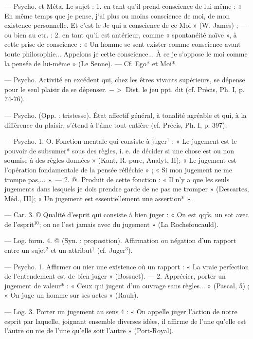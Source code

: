 
	\begin{itemize}[leftmargin=1cm, label=, itemsep=1pt]
	
 — Psycho. et Méta. Le sujet :
1. en tant qu'il prend conscience
de lui-même : « En même temps que
je pense, j'ai plus ou moins conscience de moi, de mon existence
personnelle. Et c’est le Je qui a
conscience de ce Moi » (W. James) ;
— ou bien au ctr. : 2. en tant qu'il
est antérieur, comme « spontanéité
naïve », à cette prise de conscience :
« Un homme se sent exister comme
conscience avant toute philosophie...
Appelons je cette conscience... À ce
je s'oppose le moi comme la pensée
de lui-même » (Le Senne). — Cf.
Ego* et Moi*.

 — Psycho. Activité
en excédent qui, chez les êtres
vivants supérieurs, se dépense pour
le seul plaisir de se dépenser. $->$
Dist. le jeu ppt. dit (cf. Précis, Ph. I,
p. 74-76).

 — Psycho. (Opp. : tristesse).
État affectif général, à tonalité
agréable et qui, à la différence du
plaisir, s'étend à l’âme tout entière
(cf. Précis, Ph. I, p. 397).

 — Psycho. 1. O. Fonction
mentale qui consiste à juger$^1$ : « Le
jugement est le pouvoir de subsumer* sous des règles, i. e. de décider
si une chose est ou non soumise
à des règles données » (Kant, R. pure,
Analyt, II); « Le jugement est
l’opération fondamentale de la
pensée réfléchie » ; « Si mon jugement ne me trompe pas,... ». —
2. @. Produit de cette fonction :
« Il n’y a que les seuls jugements
dans lesquels je dois prendre garde
de ne pas me tromper » (Descartes,
Méd., III); « Un jugement est essentiellement une assertion* ».

— Car. 3. © Qualité d'esprit qui
consiste à bien juger : « On est qqfs.
un sot avec de l’esprit$^{10}$; on ne l’est
jamais avec du jugement » (La
Rochefoucauld).

— Log. form. 4. @ (Syn. : proposition). Affirmation ou négation d’un
rapport entre un sujet$^2$ et un attribut$^1$
(cf. Juger$^3$).

 — Psycho. 1. Affirmer ou nier
une existence où un rapport : « La
vraie perfection de l’entendement
est de bien juger » (Bossuet). — 2.
Apprécier, porter un jugement de
valeur* : « Ceux qui jugent d'un
ouvrage sans règles... » (Pascal, 5) ;
« On juge un homme sur ses actes »
(Rauh).

— Log. 3. Porter un jugement
au sens 4 : « On appelle juger l’action
de notre esprit par laquelle, joignant
ensemble diverses idées, il affirme
de l’une qu'elle est l’autre ou nie
de l’une qu’elle soit l’autre » (Port-Royal).


\end{itemize}
